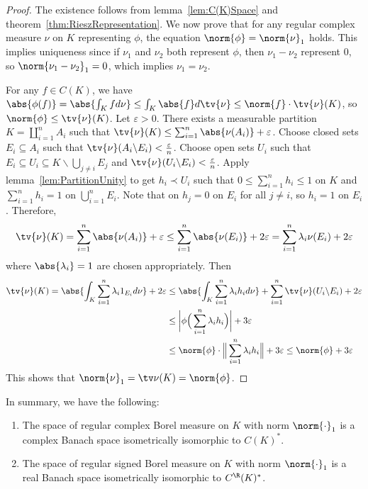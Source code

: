\documentclass[a4paper]{article}
\begin{document}
\begin{proof}
	The existence follows from lemma~\ref{lem:C(K)Space} and theorem~\ref{thm:RieszRepresentation}. We now prove that for any regular complex measure $\nu$ on $K$ representing $\phi$, the equation $\norm{\phi}=\norm{\nu}_1$ holds. This implies uniqueness since if $\nu_1$ and $\nu_2$ both represent $\phi$, then $\nu_1-\nu_2$ represent 0, so $\norm{\nu_1-\nu_2}_1=0$, which implies $\nu_1=\nu_2$.

	For any $f\in C(K)$, we have $\abs{\phi(f)}=\abs{\int_K fd\nu}\leq\int_K\abs{f}d\tv{\nu}\leq\norm{f}\cdot\tv{\nu}(K)$, so $\norm{\phi}\leq\tv{\nu}(K)$. Let $\varepsilon>0$. There exists a measurable partition $K=\coprod_{i=1}^n A_i$ such that $\tv{\nu}(K)\leq\sum_{i=1}^n\abs{\nu(A_i)}+\varepsilon$. Choose closed sets $E_i\subseteq A_i$ such that $\tv{\nu}(A_i\backslash E_i)<\frac{\varepsilon}{n}$. Choose open sets $U_i$ such that $E_i\subseteq U_i\subseteq K\backslash\bigcup_{j\not= i}E_j$ and $\tv{\nu}(U_i\backslash E_i)<\frac{\varepsilon}{n}$. Apply lemma~\ref{lem:PartitionUnity} to get $h_i\prec U_i$ such that $0\leq\sum_{i=1}^n h_i\leq 1$ on $K$ and $\sum_{i=1}^n h_i=1$ on $\bigcup_{i=1}^n E_i$. Note that on $h_j=0$ on $E_i$ for all $j\not= i$, so $h_i=1$ on $E_i$. Therefore,
	\[
	 \tv{\nu}(K)=\sum_{i=1}^n\abs{\nu(A_i)}+\varepsilon \leq\sum_{i=1}^n\abs{\nu(E_i)}+2\varepsilon= \sum_{i=1}^n\lambda_i\nu(E_i)+2\varepsilon
	\]
	where $\abs{\lambda_i}=1$ are chosen appropriately. Then
	\begin{align*}
		\tv{\nu}(K)=\abs{\int_K\sum_{i=1}^n\lambda_i 1_{E_i}d\nu}+2\varepsilon &\leq\abs{\int_K\sum_{i=1}^n\lambda_i h_id\nu}+\sum_{i=1}^n\tv{\nu}(U_i\backslash E_i)+2\varepsilon\\
		&\leq\bigg|\phi\Big(\sum_{i=1}^n\lambda_i h_i\Big)\bigg|+3\varepsilon\\
		&\leq\norm{\phi}\cdot\Big\|\sum_{i=1}^n\lambda_i h_i\Big\|+3\varepsilon\leq\norm{\phi}+3\varepsilon
  \end{align*}
  This shows that $\norm{\nu}_1=\tv\nu(K)=\norm{\phi}$.
\end{proof}

\noindent In summary, we have the following:

\begin{nthm}\label{thm:DualC(K)}
	\begin{enumerate}[label=(\roman*)]
		\item The space of regular complex Borel measure on $K$ with norm $\norm{\cdot}_1$ is a complex Banach space isometrically isomorphic to $C(K)^*$.
		\item The space of regular signed Borel measure on $K$ with norm $\norm{\cdot}_1$ is a real Banach space isometrically isomorphic to $C^\R(K)^*$.
	\end{enumerate}
\end{nthm}
\end{document}
